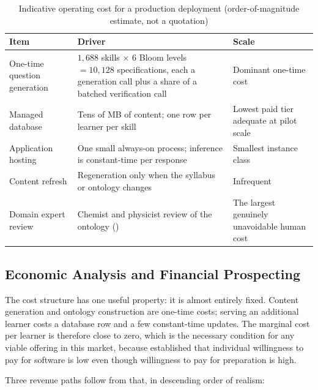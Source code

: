 \begin{table}[htbp]
  \centering
  \caption{Indicative operating cost for a production deployment (order-of-magnitude estimate, not a quotation)}
  \label{tab:opex}
  \begin{tabularx}{\textwidth}{>{\hsize}Y>{\hsize}Y>{\hsize}Y}
    \toprule
    Item & Driver & Scale \\
    \midrule
    One-time question generation & $1{,}688$ skills $\times$ 6 Bloom levels $= 10{,}128$ specifications, each a generation call plus a share of a batched verification call & Dominant one-time cost \\
    Managed database & Tens of MB of content; one row per learner per skill & Lowest paid tier adequate at pilot scale \\
    Application hosting & One small always-on process; inference is constant-time per response & Smallest instance class \\
    Content refresh & Regeneration only when the syllabus or ontology changes & Infrequent \\
    Domain expert review & Chemist and physicist review of the ontology () & The largest genuinely unavoidable human cost \\
    \bottomrule
  \end{tabularx}
\end{table}


\subsection{Economic Analysis and Financial Prospecting}
\label{sec:economics}

The cost structure has one useful property: it is almost entirely fixed. Content
generation and ontology construction are one-time costs; serving an additional
learner costs a database row and a few constant-time updates. The marginal cost
per learner is therefore close to zero, which is the necessary condition for any
viable offering in this market, because  established that
individual willingness to pay for software is low even though willingness to pay
for preparation is high.

Three revenue paths follow from that, in descending order of realism:

